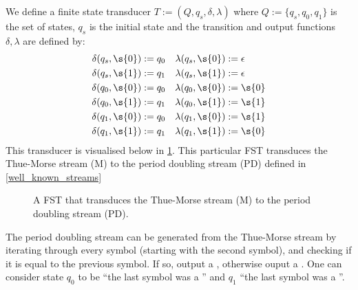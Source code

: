 \begin{example}\label{thue_morse_fst}
	We define a finite state transducer $T := (Q,q_s,\delta,\lambda)$ where $Q := \{q_s,q_0,q_1\}$ is the set of states, $q_s$ is the initial state and the transition and output functions $\delta,\lambda$ are defined by:
	\begin{align*}
		\delta(q_s,\s{0}) &:= q_0 & \lambda(q_s,\s{0}) &:= \epsilon \\
		\delta(q_s,\s{1}) &:= q_1 & \lambda(q_s,\s{1}) &:= \epsilon \\
		\delta(q_0,\s{0}) &:= q_0 & \lambda(q_0,\s{0}) &:= \s{0} \\
		\delta(q_0,\s{1}) &:= q_1 & \lambda(q_0,\s{1}) &:= \s{1} \\
		\delta(q_1,\s{0}) &:= q_0 & \lambda(q_1,\s{0}) &:= \s{1} \\
		\delta(q_1,\s{1}) &:= q_1 & \lambda(q_1,\s{1}) &:= \s{0}
	\end{align*}
	This transducer is visualised below in \cref{fst_M_to_PD}. This particular FST transduces the Thue-Morse stream (M) to the period doubling stream (PD) defined in \cref{well_known_streams} 

	\begin{figure}[H]
		\centering
		\caption{A FST that transduces the Thue-Morse stream (M) to the period doubling stream (PD).}
		\label{fst_M_to_PD}
	\end{figure}

	The period doubling stream can be generated from the Thue-Morse stream by iterating through every symbol (starting with the second symbol), and checking if it is equal to the previous symbol. If so, output a , otherwise ouput a . One can consider state $q_0$ to be ``the last symbol was a '' and $q_1$ ``the last symbol was a ''.

\end{example}